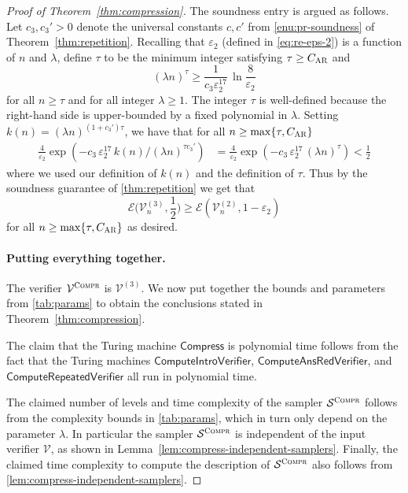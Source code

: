 \documentclass[11pt]{article}
\theoremstyle{definition}
\newcommand{\eps}{\varepsilon}
\newcommand{\sampler}{\mathcal{S}}
\newcommand{\verifier}{\mathcal{V}}
\newcommand{\gamestyle}[1]{\ensuremath{\textsc{#1}}\xspace}
\newcommand{\ar}{\gamestyle{AR}}
\newcommand{\Ent}{\mathscr{E}}
\newcommand{\compr}{\textsc{Compr}}
\newcommand{\tmstyle}[1]{\ensuremath{\mathsf{#1}}}
\newcommand{\Compress}{\tmstyle{Compress}}
\newcommand{\ComputeIntroVerifier}{\tmstyle{ComputeIntroVerifier}}
\newcommand{\ComputeAnsVerifier}{\tmstyle{ComputeAnsRedVerifier}}
\newcommand{\ComputeParrepVerifier}{\tmstyle{ComputeRepeatedVerifier}}
\begin{document}
\begin{proof}[Proof of Theorem~\ref{thm:compression}]
  The soundness entry is argued as follows. Let $c_3,c_3' > 0$ denote the universal constants $c,c'$ from  \cref{enu:pr-soundness} of Theorem~\ref{thm:repetition}. Recalling that $\eps_2$ (defined in \cref{eq:re-eps-2}) is a function of $n$ and $\lambda$, define $\tau$ to be the minimum integer satisfying $\tau \geq C_\ar$ and
\begin{equation}
\label{eq:c_rep}
  		(\lambda n)^{\tau} \geq \frac{1}{c_3 \eps_2^{17}} \, \ln \frac{8}{\eps_2}
\end{equation}
for all $n \geq \tau$ and for all integer $\lambda \geq 1$. The integer $\tau$ is well-defined because the right-hand side is upper-bounded by a fixed polynomial in $\lambda$. Setting $k(n) = (\lambda n)^{(1 + c_3')\tau}$, we have that for all $n \geq \max \{ \tau, C_\ar \}$
  \begin{align*}
  		\frac{4}{\eps_2} \exp \left ( - c_3 \, \eps_2^{17} \, k(n)/(\lambda n)^{\tau c_3'} \right) &= \frac{4}{\eps_2} \exp \left ( - c_3 \, \eps_2^{17} \, (\lambda n)^{\tau} \right) < \frac{1}{2}
  \end{align*}
  where we used our definition of $k(n)$ and the definition of $\tau$. 
Thus by the soundness guarantee of \cref{thm:repetition} we get that
  \[
  	\Ent \big(
    \verifier_n^{(3)}, \frac{1}{2} \big) \geq \Ent(\verifier_n^{(2)}, 1 - \eps_2)
  \]
  for all $n \geq \max \{ \tau, C_\ar \}$ as desired.  
  


  \paragraph{Putting everything together.}
  The verifier $\verifier^\compr$ is $\verifier^{(3)}$.
  We now put together the bounds and parameters from \cref{tab:params} to obtain
  the conclusions stated in Theorem~\ref{thm:compression}.

The claim that the Turing machine $\Compress$ is polynomial time follows from
  the fact that the Turing machines $\ComputeIntroVerifier$, $\ComputeAnsVerifier$, and $\ComputeParrepVerifier$ all run in polynomial time.

The claimed number of levels and time complexity of the sampler
  $\sampler^\compr$ follows from the complexity bounds in \cref{tab:params},
  which in turn only depend on the parameter $\lambda$.
In particular the sampler $\sampler^\compr$ is {independent} of the input
  verifier $\verifier$, as shown in
  Lemma~\ref{lem:compress-independent-samplers}.
  Finally, the claimed time complexity to compute the description of
  $\sampler^\compr$ also follows from \cref{lem:compress-independent-samplers}.


\end{proof}
\end{document}
